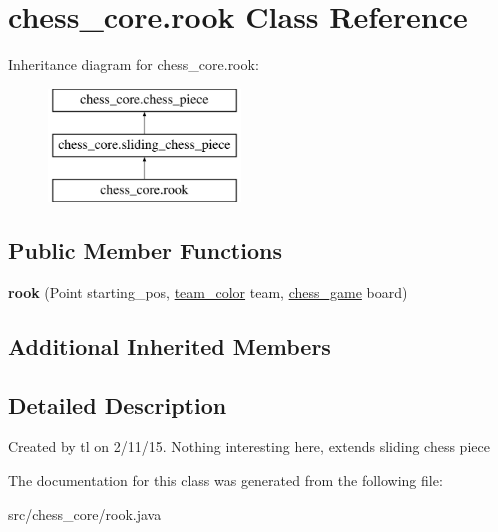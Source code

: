 \hypertarget{classchess__core_1_1rook}{}\section{chess\+\_\+core.\+rook Class Reference}
\label{classchess__core_1_1rook}
Inheritance diagram for chess\+\_\+core.\+rook\+:\begin{figure}[H]
\begin{center}
\leavevmode
\includegraphics[height=3.000000cm]{classchess__core_1_1rook}
\end{center}
\end{figure}
\subsection*{Public Member Functions}
\begin{DoxyCompactItemize}
\item 
\hypertarget{classchess__core_1_1rook_a43e2fdb036efc12ba465107eeb10d6f3}{}{\bfseries rook} (Point starting\+\_\+pos, \hyperlink{enumchess__core_1_1team__color}{team\+\_\+color} team, \hyperlink{classchess__core_1_1chess__game}{chess\+\_\+game} board)\label{classchess__core_1_1rook_a43e2fdb036efc12ba465107eeb10d6f3}

\end{DoxyCompactItemize}
\subsection*{Additional Inherited Members}


\subsection{Detailed Description}
Created by tl on 2/11/15. Nothing interesting here, extends sliding chess piece 

The documentation for this class was generated from the following file\+:\begin{DoxyCompactItemize}
\item 
src/chess\+\_\+core/rook.\+java\end{DoxyCompactItemize}
